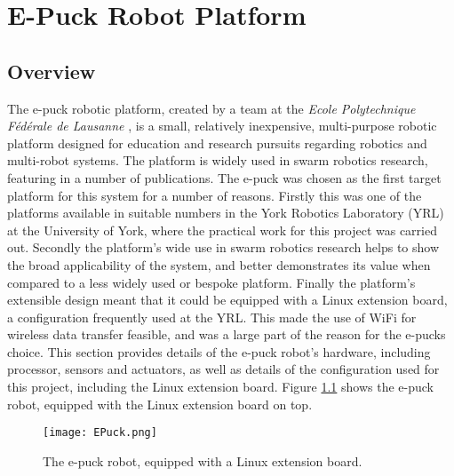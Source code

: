 
\chapter[E-Puck Robot Platform]{E-Puck Robot Platform} %

\label{Chapter5} %


\section{Overview}
The e-puck robotic platform, created by a team at the \textit{Ecole Polytechnique Fédérale de Lausanne} \cite{epuck}, is a small, relatively inexpensive, multi-purpose robotic platform designed for education and research pursuits regarding robotics and multi-robot systems. The platform is widely used in swarm robotics research, featuring in a number of publications. The e-puck was chosen as the first target platform for this system for a number of reasons. Firstly this was one of the platforms available in suitable numbers in the York Robotics Laboratory (YRL) at the University of York, where the practical work for this project was carried out. Secondly the platform's wide use in swarm robotics research helps to show the broad applicability of the system, and better demonstrates its value when compared to a less widely used or bespoke platform. Finally the platform's extensible design meant that it could be equipped with a Linux extension board, a configuration frequently used at the YRL. This made the use of WiFi for wireless data transfer feasible, and was a large part of the reason for the e-pucks choice. This section provides details of the e-puck robot's hardware, including processor, sensors and actuators, as well as details of the configuration used for this project, including the Linux extension board. Figure \ref{fig:EPuck} shows the e-puck robot, equipped with the Linux extension board on top.

\begin{figure}
	\begin{center}
	\texttt{[image: EPuck.png]}
	\decoRule
	\caption[The e-puck Robot]{The e-puck robot, equipped with a Linux extension board.}
	\label{fig:EPuck}
	\end{center}
\end{figure}

